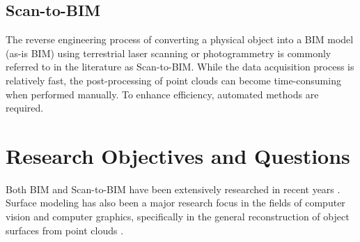 \subsection{Scan-to-BIM}
The reverse engineering process of converting a physical object into a BIM model (as-is BIM) using terrestrial laser scanning or photogrammetry is commonly referred to in the literature as Scan-to-BIM. While the data acquisition process is relatively fast, the post-processing of point clouds can become time-consuming when performed manually. To enhance efficiency, automated methods are required.

\section{Research Objectives and Questions}
\begin{comment}
Sowohl BIM als auch scan-to-BIM wurden wurden in den letzten jahren intensiv erforscht \cite{rochaSurveyScantoBIMPractices2021}. \\
Ebenfalls stark erforscht wurde surface modelling in der computer vision und computergrafik. dabei handelt es sich um die allgemeine rekonstruktion von objektoberflächen aus punktwolken in der computer vision und computergrafik \cite{nanPolyFitPolygonalSurface2017}. \\
es gibt viele bereits entwickelte algorithmen, die sich für die modellierung von punktwolkendaten eignen könnten. Einige existieren als Code, andere wurden bereits als plugin für BIM software implementiert. die algorithmen haben jeweils einen unterschiedlichen fokus und eignen sich für unterschiedliche anwendungen. die überischt zu bewahren ist schwierig. ein dominierender algorithmus, der in sätmlichen anwendungsfällen und die besten ergebnisse liefert, konnte nicht identifiziert werden. im rahmen der arbeit sollen daher in einem ersten teil unterschiedliche algorithmen verglichen werden. in einem zweiten teil soll der erfolgsversprechendste ansatz anschliessend praxisnah implementiert werden und handlungsempfehlungen an die hand gegeben werden. es werden daraus folgende forschungsfragen abgeleitet:\\

\begin{itemize}
    \item \textbf{Forschungsfrage 1:} Welcher Algorithmus ist für eine praxisorientierte Implementierung eines Scan-to-BIM ablaufs am erfolgsversprechendsten?
    \item \textbf{Forschungsfrage 2:} Wie kann der erfolgsversprechendste Algorithmus die effizienz eines bestehenden Can-to-BIM ablauf verbessern?
\end{itemize}
\end{comment}
Both BIM and Scan-to-BIM have been extensively researched in recent years \cite{rochaSurveyScantoBIMPractices2021}.
Surface modeling has also been a major research focus in the fields of computer vision and computer graphics, specifically in the general reconstruction of object surfaces from point clouds \cite{nanPolyFitPolygonalSurface2017}.

